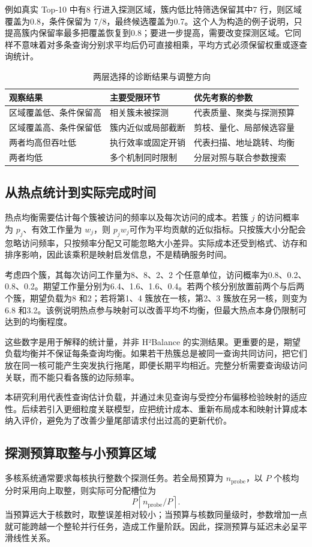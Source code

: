例如真实 Top-10 中有8 行进入探测区域，簇内低比特筛选保留其中7 行，则区域覆盖为0.8，条件保留为 $7/8$，最终候选覆盖为0.7。这个人为构造的例子说明，只提高簇内保留率最多把覆盖恢复到0.8；要进一步提高，需要改变探测区域。它同样不意味着对多条查询分别求平均后仍可直接相乘，平均方式必须保留权重或逐查询统计。

\begin{table}[htbp]\centering\caption{两层选择的诊断结果与调整方向}
\begin{tabularx}{\textwidth}{p{3.4cm}XX}\toprule
观察结果&主要受限环节&优先考察的参数\\\midrule
区域覆盖低、条件保留高&相关簇未被探测&代表质量、聚类与探测预算\\
区域覆盖高、条件保留低&簇内近似或局部截断&剪枝、量化、局部候选容量\\
两者均高但吞吐低&执行效率或固定开销&代表扫描、地址跳转、均衡\\
两者均低&多个机制同时限制&分层对照与联合参数搜索\\\bottomrule
\end{tabularx}\end{table}

\subsection{从热点统计到实际完成时间}
热点均衡需要估计每个簇被访问的频率以及每次访问的成本。若簇 $j$ 的访问概率为 $p_j$、有效工作量为 $w_j$，则 $p_jw_j$可作为平均贡献的近似指标。只按簇大小分配会忽略访问频率，只按频率分配又可能忽略大小差异。实际成本还受到格式、访存和排序影响，因此该乘积是映射启发信息，不是精确服务时间。

考虑四个簇，其每次访问工作量为8、8、2、2 个任意单位，访问概率为0.8、0.2、0.8、0.2。期望工作量分别为6.4、1.6、1.6、0.4。若两个核分别放置前两个与后两个簇，期望负载为8 和2；若将第1、4 簇放在一核，第2、3 簇放在另一核，则变为6.8 和3.2。该例说明热点参与映射可以改善平均不均衡，但最大热点本身仍限制可达到的均衡程度。

这些数字是用于解释的统计量，并非 H²Balance 的实测结果。更重要的是，期望负载均衡并不保证每条查询均衡。如果若干热簇总是被同一查询共同访问，把它们放在同一核可能产生突发执行拖尾，即便长期平均相近。完整分析需要查询级访问关联，而不能只看各簇的边际频率。

本研究利用代表性查询估计负载，并通过未见查询与受控分布偏移检验映射的适应性。后续若引入更细粒度关联模型，应把统计成本、重新布局成本和映射计算成本纳入评价，避免为了改善少量尾部请求付出过高的更新代价。

\subsection{探测预算取整与小预算区域}
多核系统通常要求每核执行整数个探测任务。若全局预算为 $n_{\mathrm{probe}}$，以 $P$ 个核均分时采用向上取整，则实际可分配槽位为
\begin{equation}
 P\left\lceil n_{\mathrm{probe}}/P\right\rceil.
\end{equation}
当预算远大于核数时，取整误差相对较小；当预算与核数同量级时，参数增加一点就可能跨越一个整轮并行任务，造成工作量阶跃。因此，探测预算与延迟未必呈平滑线性关系。

